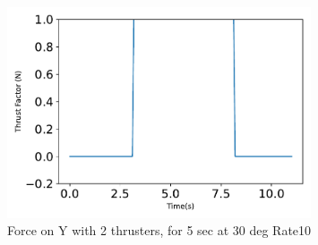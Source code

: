 \begin{figure}[htbp]\centerline{\includegraphics[width=0.8\textwidth]{AutoTeX/Force_2Thrusters_5s_30deg_Loc2_Rate10}}\caption{Force on Y with 2 thrusters, for 5 sec at 30 deg Rate10}\label{fig:Force_2Thrusters_5s_30deg_Loc2_Rate10}\end{figure}